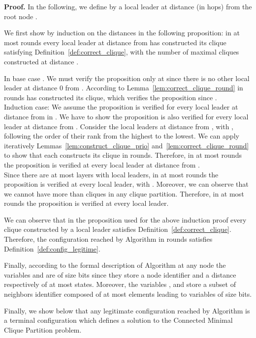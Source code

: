 \documentclass[11pt,letterpaper,onecolumn]{article}
\newenvironment{proof}{\noindent \begin{rm}{\textbf{Proof.} }}{\hspace*{\fill}\par\end{rm} \vspace{.3cm}}
\begin{document}
\begin{proof}
In the following, we define by  a local leader  at distance  (in hops) from the root node .

We first show by induction on the distances in  the following proposition: in at most  rounds every local leader  at distance  from  has constructed its clique  satisfying Definition~\ref{def:correct_clique}, with  the number of maximal cliques constructed at distance .

In base case . We must verify the proposition only at  since there is no other local leader at distance 0 from . According to Lemma~\ref{lem:correct_clique_round} in  rounds  has constructed its clique, which verifies the proposition since .\\
Induction case: We assume the proposition is verified for every local leader at distance  from  in . We have to show the proposition is also verified for every local leader at distance  from . Consider the local leaders  at distance  from , with , following the order of their rank from the highest to the lowest. We can apply iteratively Lemmas~\ref{lem:construct_clique_prio} and~\ref{lem:correct_clique_round} to show that each  constructs its clique in  rounds. Therefore, in at most  rounds the proposition is verified at every local leader at distance  from .\\
Since there are at most  layers with local leaders, in at most  rounds the proposition is verified at every local leader, with . Moreover, we can observe that we cannot have more than  cliques in any clique partition. Therefore, in at most  rounds the proposition is verified at every local leader.

We can observe that in the proposition used for the above induction proof every clique constructed by a local leader satisfies Definition~\ref{def:correct_clique}. Therefore, the configuration  reached by Algorithm  in  rounds satisfies Definition~\ref{def:config_legitime}.

Finally, according to the formal description of Algorithm  at any node  the variables  and  are of size  bits since they store a node identifier and a distance respectively of at most  states. Moreover, the variables ,  and  store a subset of neighbors identifier composed of at most  elements leading to variables of size  bits.
\end{proof}

Finally, we show below that any legitimate configuration reached by Algorithm  is a terminal configuration which defines a solution to the Connected Minimal Clique Partition problem.
\end{document}
